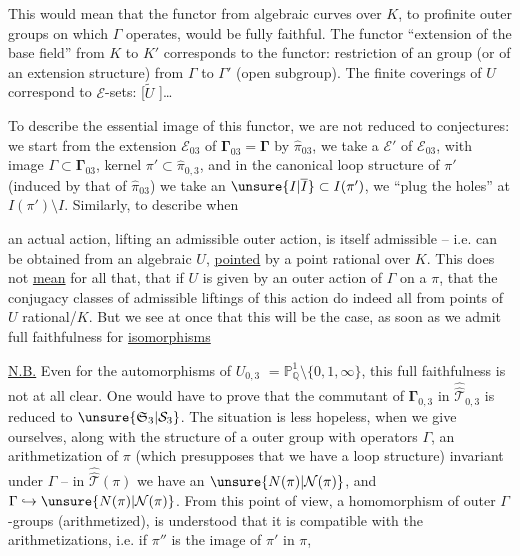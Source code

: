 This would mean that the functor from algebraic
curves over $K$, to profinite outer groups
on which $\Gamma$ operates, would be fully faithful.
The functor ``extension of the base field'' from
$K$ to $K'$ corresponds to the functor: restriction
of an  group (or of an extension
structure) from $\Gamma$ to $\Gamma'$ (open subgroup).
The finite  coverings of $U$ correspond to
$\mathcal E$-sets: [$\widetilde U$ ]\ldots

To describe the essential image of this
functor, we are not reduced to conjectures:
we start from the  extension $\mathcal E_{03}$ of $\boldsymbol{\Gamma}_{03}=\boldsymbol{\Gamma}$
by $\widehat{\pi}_{03}$, we take a   $\mathcal E'$
of $\mathcal E_{03}$, with image $\Gamma\subset\boldsymbol{\Gamma}_{03}$, kernel
$\pi'\subset\widehat{\pi}_{0,3}$, and in the canonical loop structure
of $\pi'$ (induced by that of $\widehat{\pi}_{03}$)
we take an $\unsure{I|\overline I}\subset I(\pi')$,  we ``plug the holes''
at $I(\pi')\setminus I$. Similarly, to describe when

an actual action, lifting an admissible outer
action, is itself admissible -- 
i.e. can be obtained from an algebraic 
$U$, \uline{pointed} by a point rational over $K$.
This does not \uline{mean} for all that, that if
$U$ is given by an outer action of $\Gamma$ on a $\pi$,
that the conjugacy classes of admissible liftings
of this action do indeed all  from
points of $U$ rational/$K$. But we see at once that
this will be the case, as soon as we admit
full faithfulness for \uline{isomorphisms}

\uline{N.B.} Even for the automorphisms of $U_{0,3}$
$=\mathbb P^1_{\mathbb Q}\setminus\{0,1,\infty\}$, this full faithfulness is not
at all clear. One would have to prove that 
the commutant of $\boldsymbol{\Gamma}_{0,3}$ in $\widehat{\widehat{\mathcal T}}_{0,3}$ is reduced
to $\unsure{\mathfrak S_3|\mathcal S_3}$. The situation is less hopeless,
when we give ourselves, along with the structure of
a  outer group with operators $\Gamma$, an arithmetization
of $\pi$ (which presupposes that we have 
a loop structure) invariant under  $\Gamma$
--  in $\widehat{\widehat{\mathcal T}}(\pi)$ we have an $\unsure{N(\pi)|\mathcal N(\pi)}$,
and $\Gamma\hookrightarrow\unsure{N(\pi)|\mathcal N(\pi)}$. From this point of view,  a
homomorphism  of outer $\Gamma$-groups (arithmetized),
 is understood that it is compatible with
the arithmetizations, i.e. if $\pi''$ is the image of $\pi'$ in $\pi$,

